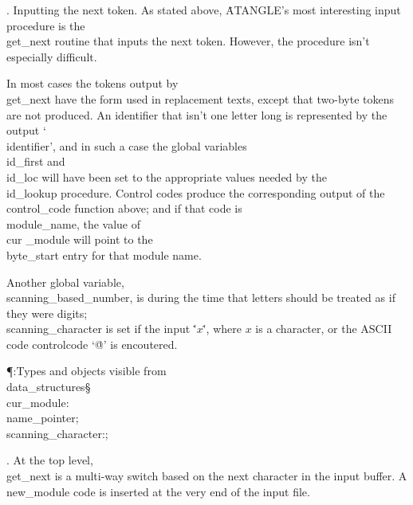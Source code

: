 .  Inputting the next token.
As stated above, \.{ATANGLE}'s most interesting input procedure is the
\\{get\_next} routine that inputs the next token. However, the procedure
isn't especially difficult.

In most cases the tokens output by \\{get\_next} have the form used in
replacement texts, except that two-byte tokens are not produced.
An identifier that isn't one letter long is represented by the
output `\\{identifier}', and in such a case the global variables
\\{id\_first} and \\{id\_loc} will have been set to the appropriate values
needed by the \\{id\_lookup} procedure.
Control codes produce the corresponding output of the \\{control\_code}
function above; and if that code is \\{module\_name}, the value of \\{cur%
\_module}
will point to the \\{byte\_start} entry for that module name.

Another global variable, \\{scanning\_based\_number}, is  during the
time
that letters should be treated as if they were digits; \\{scanning\_character}
is set  if the input \.'$x$\.', where $x$ is a character, or the
ASCII code controlcode `\.{@'} is encoutered.

\Y\P\?\4:Types and objects visible from \\{data\_structures}\X\mathrel{+}\S%
\?\6
\\{cur\_module}\?:\?\\{name\_pointer};\6
\\{scanning\_character}\?:\?\?\K\?;\par
\fi

. At the top level, \\{get\_next} is a multi-way switch based on the next
character in the input buffer. A \\{new\_module} code is inserted at the
very end of the input file.

